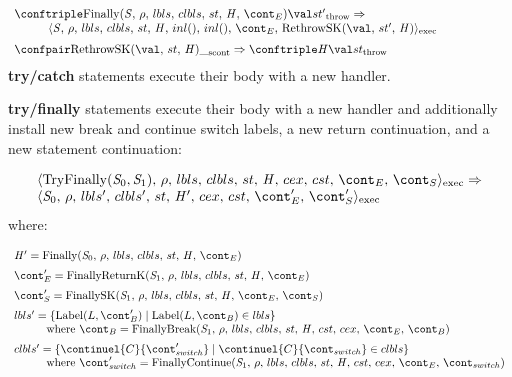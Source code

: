 \documentclass{article}
\begin{document}
\[
  \begin{array}{lcl}
	\throwconf{\FinallyK{\stmt}}{\val}{\strace'}
	\Rightarrow \\
	\hspace{10mm}\execconf{\stmt}{\env}{\lbls}{\clbls}{\handler}{inl()}{inl()}{\econt}{\RethrowSK{\val}{\strace'}{\handler}}\hspace{20mm}\\[2mm]

	\scontconf{\RethrowSK{\val}{\strace}{\handler}}{\_}
	\Rightarrow \throwconf{\handler}{\val}{\strace}

  \end{array}
\]
\noindent
\textbf{try/catch} statements execute their body with a new handler.

\noindent
\textbf{try/finally} statements execute their body with a new handler and additionally install new break and continue switch labels, a new return continuation, and a new statement continuation:

\[
  \begin{array}{lcl}
	\execconf{\mathrm{TryFinally}(\stmti{0}, \stmti{1})}{\env}{\lbls}{\clbls}{\handler}{\cex}{\cstrace}{\econt}{\scont}
	\Rightarrow\\
	\execconf{\stmti{0}}{\env}{\lbls'}{\clbls'}{\handler'}{\cex}{\cstrace}{\econt'}{\scont'}
	  \end{array}
\]
where:

\[
  \begin{array}{lcl}
	\handler' = \FinallyK{\stmti{0}}\hspace{50mm}\\[2mm]

	\econt' = \FinallyReturnK{\stmti{1}}\\[2mm]

	\scont' = \FinallySK{\stmti{1}}\\[2mm]

	\lbls' = \lbrace \mathrm{Label}(L, \bcont') \mid \mathrm{Label}(L, \bcont) \in \lbls\rbrace \\
	\hspace{10mm}\textrm{where } \bcont = \finallybreak{\stmti{1}}{\bcont}\\[2mm]
	\clbls' =  \lbrace \continuel{C}{\switchcont'} \mid  \continuel{C}{\switchcont} \in \clbls\rbrace\\
	\hspace{10mm}\textrm{where } \switchcont' = \FinallyContinue{\stmti{1}}{\switchcont}

  \end{array}
\]
\end{document}
